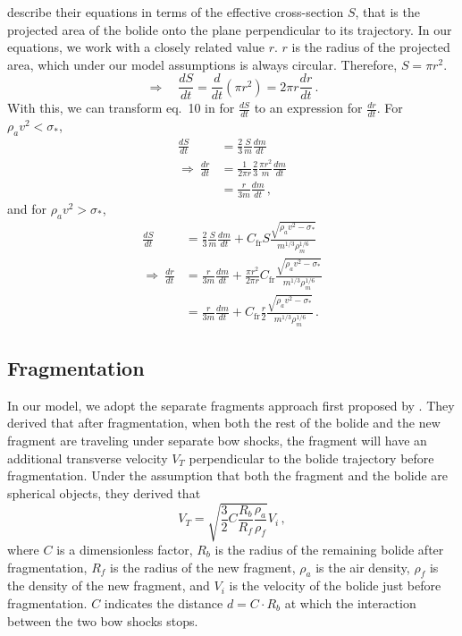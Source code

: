 \cite{avramenko2014simulation} describe their equations in terms of the effective cross-section $S$, that is the projected area of the bolide onto the plane perpendicular to its trajectory. In our equations, we work with a closely related value $r$. $r$ is the radius of the projected area, which under our model assumptions is always circular. Therefore, $S = \pi r^2$.
\begin{equation}
    \Rightarrow \quad \frac{dS}{dt} = \frac{d}{dt}\left(\pi r^2\right) = 2\pi r \frac{dr}{dt}\,.
\end{equation}
With this, we can transform eq.~10 in \cite{avramenko2014simulation} for $\frac{dS}{dt}$ to an expression for $\frac{dr}{dt}$.
For $\rho_a v^2 < \sigma_*$,
\begin{align*}
    \frac{dS}{dt} &= \frac{2}{3} \frac{S}{m} \frac{dm}{dt} \\
    \Rightarrow\ \frac{dr}{dt} &= \frac{1}{2\pi r} \frac{2}{3} \frac{\pi r^2}{m} \frac{dm}{dt} \\
    &= \frac{r}{3m} \frac{dm}{dt}\,,
\end{align*}
and for $\rho_a v^2 > \sigma_*$,
\begin{align*}
    \frac{dS}{dt} &= \frac{2}{3} \frac{S}{m} \frac{dm}{dt} + C_\mathrm{fr}S\frac{\sqrt{\rho_a v^2 - \sigma_*}}{m^{1/3}\rho_m^{1/6}} \\
    \Rightarrow\ \frac{dr}{dt} &= \frac{r}{3m} \frac{dm}{dt} + \frac{\pi r^2}{2\pi r} C_\mathrm{fr}\frac{\sqrt{\rho_a v^2 - \sigma_*}}{m^{1/3}\rho_m^{1/6}} \\
    &= \frac{r}{3m} \frac{dm}{dt} +  C_\mathrm{fr} \frac{r}{2} \frac{\sqrt{\rho_a v^2 - \sigma_*}}{m^{1/3}\rho_m^{1/6}}\,.
\end{align*}

\subsection{Fragmentation}

In our model, we adopt the separate fragments approach first proposed by \cite{passey1980effects}.
They derived that after fragmentation, when both the rest of the bolide and the new fragment are traveling under separate bow shocks, 
the fragment will have an additional transverse velocity $V_T$ perpendicular to the bolide trajectory before fragmentation.
Under the assumption that both the fragment and the bolide are spherical objects,
they derived that
\begin{equation}
    V_T = \sqrt{\frac{3}{2}C\frac{R_b}{R_f}\frac{\rho_a}{\rho_f}}V_i\,,
    \label{eq:v_t}
\end{equation}
where $C$ is a dimensionless factor, $R_b$ is the radius of the remaining bolide after fragmentation,
$R_f$ is the radius of the new fragment, $\rho_a$ is the air density, $\rho_f$ is the density of the new fragment,
and $V_i$ is the velocity of the bolide just before fragmentation. $C$ indicates the distance $d = C\cdot R_b$ at which the interaction between the two bow shocks stops.

